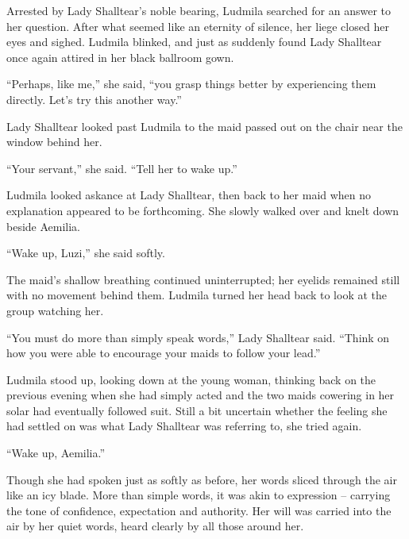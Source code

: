 Arrested by Lady Shalltear’s noble bearing, Ludmila searched for an answer to her question. After what seemed like an eternity of silence, her liege closed her eyes and sighed. Ludmila blinked, and just as suddenly found Lady Shalltear once again attired in her black ballroom gown.

 

“Perhaps, like me,” she said, “you grasp things better by experiencing them directly. Let’s try this another way.”

 

Lady Shalltear looked past Ludmila to the maid passed out on the chair near the window behind her.

 

“Your servant,” she said. “Tell her to wake up.”

 

Ludmila looked askance at Lady Shalltear, then back to her maid when no explanation appeared to be forthcoming. She slowly walked over and knelt down beside Aemilia.

 

“Wake up, Luzi,” she said softly.

 

The maid’s shallow breathing continued uninterrupted; her eyelids remained still with no movement behind them. Ludmila turned her head back to look at the group watching her.

 

“You must do more than simply speak words,” Lady Shalltear said. “Think on how you were able to encourage your maids to follow your lead.”

 

Ludmila stood up, looking down at the young woman, thinking back on the previous evening when she had simply acted and the two maids cowering in her solar had eventually followed suit. Still a bit uncertain whether the feeling she had settled on was what Lady Shalltear was referring to, she tried again.

 

“Wake up, Aemilia.”

 

Though she had spoken just as softly as before, her words sliced through the air like an icy blade. More than simple words, it was akin to expression – carrying the tone of confidence, expectation and authority. Her will was carried into the air by her quiet words, heard clearly by all those around her.

 

